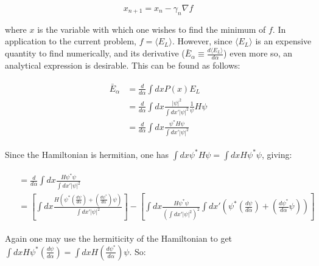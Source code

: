 \documentclass[english, a4paper]{article}
\begin{document}
\begin{equation}
x_{n+1} = x_n - \gamma_n\nabla f
\end{equation}

where $x$ is the variable with which one wishes to find the minimum of $f$. In application to the current problem, $f = \langle E_L\rangle$. However, since $\langle E_L\rangle$ is an expensive quantity to find numerically, and its derivative ($\bar{E}_\alpha \equiv \frac{d\langle E_L\rangle}{d\alpha}$) even more so, an analytical expression is desirable. This can be found as follows:

\begin{align}
\begin{split}
\bar{E}_\alpha &= \frac{d}{d\alpha}\int dx P(x) E_L\\
&= \frac{d}{d\alpha}\int dx \frac{|\psi|^2}{\int dx'|\psi|^2}\frac{1}{\psi}H\psi\\
&= \frac{d}{d\alpha}\int dx \frac{\psi^*H\psi}{\int dx'|\psi|^2}
\end{split}
\end{align}

Since the Hamiltonian is hermitian, one has $\int dx\psi^* H \psi = \int dx H\psi^*\psi$, giving:

\begin{align}
\begin{split}
&= \frac{d}{d\alpha}\int dx \frac{H\psi^*\psi}{\int dx'|\psi|^2}\\
&= \left[ \int dx\frac{H\left(\psi^*\left(\frac{d\psi}{d\alpha}\right) + \left(\frac{d\psi^*}{d\alpha}\right)\psi\right)}{\int dx'|\psi|^2} \right] - \left[ \int dx \frac{H\psi^*\psi}{\left(\int dx'|\psi|^2\right)^2}\int dx'\left( \psi^*\left(\frac{d\psi}{d\alpha}\right) + \left(\frac{d\psi^*}{d\alpha}\psi\right) \right) \right]
\end{split}
\end{align}

Again one may use the hermiticity of the Hamiltonian to get $\int dx H \psi^*\left(\frac{d\psi}{d\alpha}\right) = \int dx H \left(\frac{d\psi^*}{d\alpha}\right)\psi$. So:
\end{document}
